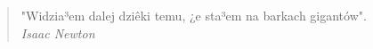 \documentclass{pracamgr}
\begin{document}
\begin{quote}
"Widzia³em dalej dziêki temu, ¿e sta³em na barkach gigantów".\\

\raggedleft\slshape Isaac Newton
\end{quote}





\end{document}
